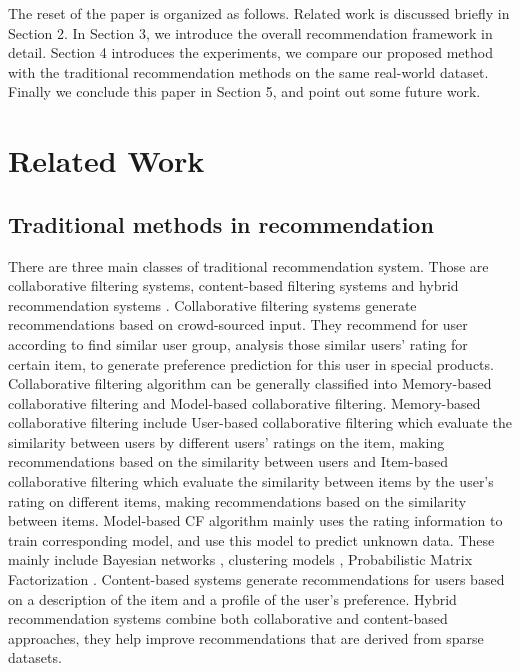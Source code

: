 \documentclass[runningheads]{llncs}
\begin{document}
The reset of the paper is organized as follows. Related work is discussed briefly in Section 2. In Section 3, we introduce the overall recommendation framework in detail. Section 4 introduces the experiments, we compare our proposed method with the traditional recommendation methods on the same real-world dataset. Finally we conclude this paper in Section 5, and point out some future work.

\section{Related Work}
\subsection{Traditional methods in recommendation}

There are three main classes of traditional recommendation system. Those are collaborative filtering systems, content-based filtering systems and hybrid recommendation systems \cite{12}. Collaborative filtering \cite{1,2,3,4} systems generate recommendations based on crowd-sourced input. They recommend for user according to find similar user group, analysis those similar users’ rating for certain item, to generate preference prediction for this user in special products. Collaborative filtering algorithm can be generally classified into Memory-based \cite{1,2} collaborative filtering and Model-based \cite{3,4,5}collaborative filtering. Memory-based collaborative filtering include User-based collaborative filtering \cite{1} which evaluate the similarity between users by different users’ ratings on the item, making recommendations based on the similarity between users and Item-based collaborative filtering \cite{2} which evaluate the similarity between items by the user’s rating on different items, making recommendations based on the similarity between items. Model-based CF algorithm mainly uses the rating information to train corresponding model, and use this model to predict unknown data. These mainly include Bayesian networks \cite{3}, clustering models \cite{4}, Probabilistic Matrix Factorization \cite{5}. Content-based systems \cite{6} generate recommendations for users based on a description of the item and a profile of the user’s preference. Hybrid recommendation systems \cite{7} combine both collaborative and content-based approaches, they help improve recommendations that are derived from sparse datasets.
\end{document}

